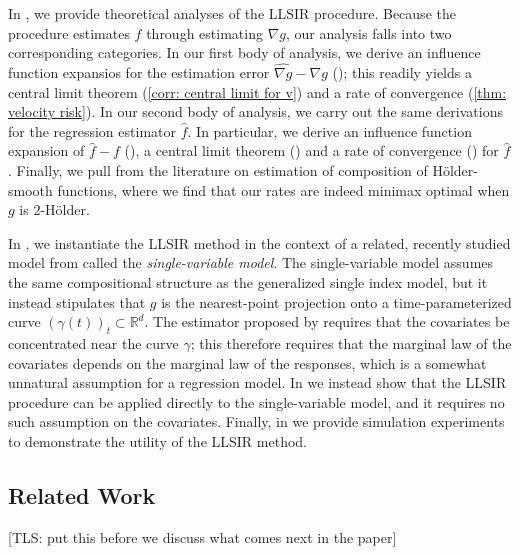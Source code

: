 \documentclass[11pt]{article}
\newcommand{\tls}[1]{{\color{cyan}[TLS: #1]}}
\begin{document}
In , we provide theoretical analyses of the LLSIR procedure. Because the procedure estimates $f$ through estimating $\nabla g$, our analysis falls into two corresponding categories. In our first body of analysis, we derive an influence function expansios for the estimation error $\widehat{\nabla g} - \nabla g$ (); this readily yields a central limit theorem (\cref{corr: central limit for v}) and a rate of convergence (\cref{thm: velocity risk}). In our second body of analysis, we carry out the same derivations for the regression estimator $\hat f$. In particular, we derive an influence function expansion of $\hat f - f$ (), a central limit theorem () and a rate of convergence () for $\hat f$. Finally, we pull from the literature on estimation of composition of H\"older-smooth functions, where we find that our rates are indeed minimax optimal when $g$ is $2$-H\"older. 

In , we instantiate the LLSIR method in the context of a related, recently studied model from \citet{wu2024conditional} called the \emph{single-variable model}. The single-variable model assumes the same compositional structure as the generalized single index model, but it instead stipulates that $g$ is the nearest-point projection onto a time-parameterized curve $(\gamma(t))_{t} \subset \mathbb R^d$. The estimator proposed by \citet{wu2024conditional} requires that the covariates be concentrated near the curve $\gamma$; this therefore requires that the marginal law of the covariates depends on the marginal law of the responses, which is a somewhat unnatural assumption for a regression model. In   we instead show that the LLSIR procedure can be applied directly to the single-variable model, and it requires no such assumption on the covariates. Finally, in  we provide simulation experiments to demonstrate the utility of the LLSIR method.





\subsection{Related Work}
\tls{put this before we discuss what comes next in the paper}
\end{document}
